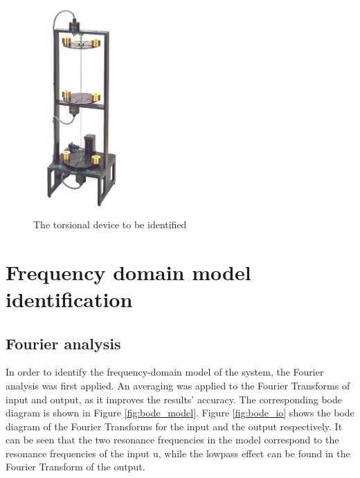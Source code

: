 \documentclass[a4paper,11pt]{article}
\begin{document}
\begin{figure}[H]
\centering
\includegraphics[height = 8cm]{images/torsionalsystem}
\caption{The torsional device to be identified}
\label{fig:system}
\end{figure}

\section{Frequency domain model identification}

\subsection{Fourier analysis}
In order to identify the frequency-domain model of the system, the Fourier analysis was first applied. An averaging was applied to the Fourier Transforms of input and output, as it improves the results' accuracy. The corresponding bode diagram is shown in Figure \ref{fig:bode_model}. Figure \ref{fig:bode_io} shows the bode diagram of the Fourier Transforms for the input and the output respectively. It can be seen that the two resonance frequencies in the model correspond to the resonance frequencies of the input u, while the lowpass effect can be found in the Fourier Transform of the output.
\end{document}
